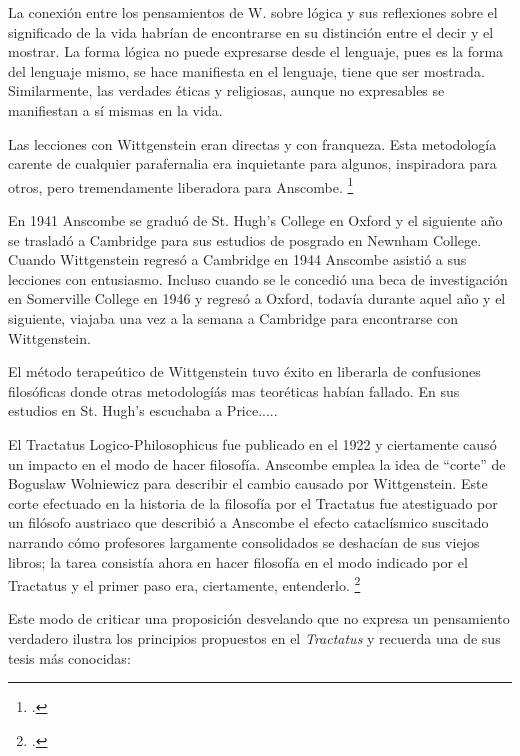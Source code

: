 La conexión entre los pensamientos de W. sobre lógica y sus reflexiones sobre el
significado de la vida habrían de encontrarse en su distinción entre el decir y
el mostrar. La forma lógica no puede expresarse desde el lenguaje, pues es la
forma del lenguaje mismo, se hace manifiesta en el lenguaje, tiene que ser
mostrada. Similarmente, las verdades éticas y religiosas, aunque no expresables
se manifiestan a sí mismas en la vida. 

Las lecciones con Wittgenstein eran directas y con franqueza. Esta metodología
carente de cualquier parafernalia era inquietante para algunos, inspiradora para
otros, pero tremendamente liberadora para Anscombe. \footcite[loc 9853 Chapter
4, Section 24, para. 5]{monk}

En 1941 Anscombe se graduó de St. Hugh's College en Oxford y el siguiente año se
trasladó a Cambridge para sus estudios de posgrado en Newnham College. Cuando
Wittgenstein regresó a Cambridge en 1944 Anscombe asistió a sus lecciones con
entusiasmo. Incluso cuando se le concedió una beca de investigación en
Somerville College en 1946 y regresó a Oxford, todavía durante aquel año y el
siguiente, viajaba una vez a la semana a Cambridge para encontrarse con
Wittgenstein.  

El método terapeútico de Wittgenstein tuvo éxito en liberarla de confusiones
filosóficas donde otras metodologíás mas teoréticas habían fallado. En sus
estudios en St. Hugh's escuchaba a Price.....



El Tractatus Logico-Philosophicus fue publicado en el 1922 y ciertamente causó
un impacto en el modo de hacer filosofía. Anscombe emplea la idea de ``corte''
de Boguslaw Wolniewicz para describir el cambio causado por Wittgenstein. Este
corte efectuado en la historia de la filosofía por el Tractatus fue atestiguado
por un filósofo austriaco que describió a Anscombe el efecto cataclísmico
suscitado narrando cómo profesores largamente consolidados se deshacían de sus
viejos libros; la tarea consistía ahora en hacer filosofía en el modo indicado
por el Tractatus y el primer paso era, ciertamente, entenderlo.
\footcite[p.181]{twocuts} 


Este modo de criticar una proposición desvelando que no expresa un pensamiento
verdadero ilustra los principios propuestos en el \emph{Tractatus} y recuerda
una de sus tesis más conocidas: 



